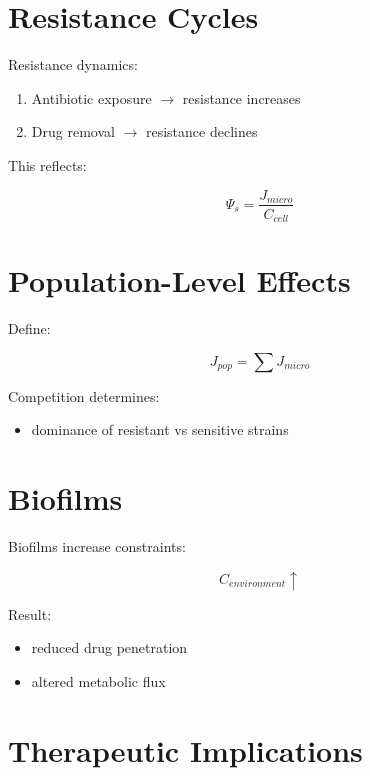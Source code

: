\documentclass[11pt]{article}
\begin{document}
\section{Resistance Cycles}

Resistance dynamics:

\begin{enumerate}
    \item Antibiotic exposure $\rightarrow$ resistance increases
    \item Drug removal $\rightarrow$ resistance declines
\end{enumerate}

This reflects:

\begin{equation}
\Psi_s = \frac{J_{micro}}{C_{cell}}
\end{equation}

\section{Population-Level Effects}

Define:

\begin{equation}
J_{pop} = \sum J_{micro}
\end{equation}

Competition determines:

\begin{itemize}
    \item dominance of resistant vs sensitive strains
\end{itemize}

\section{Biofilms}

Biofilms increase constraints:

\begin{equation}
C_{environment} \uparrow
\end{equation}

Result:

\begin{itemize}
    \item reduced drug penetration
    \item altered metabolic flux
\end{itemize}

\section{Therapeutic Implications}
\end{document}
